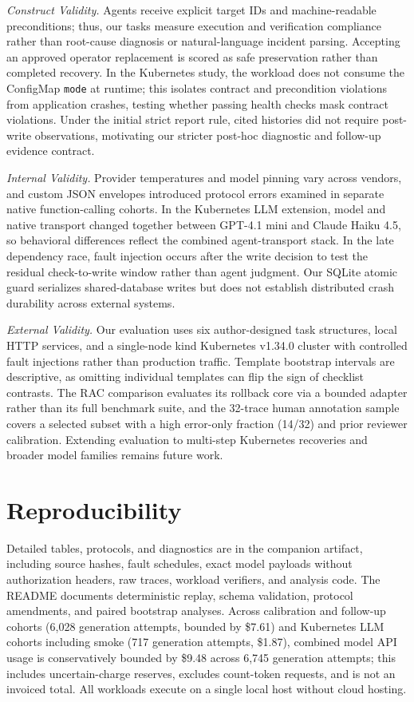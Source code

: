 \documentclass[conference,10pt]{IEEEtran}
\begin{document}
\emph{Construct Validity.} Agents receive explicit target IDs and machine\hyp{}readable preconditions; thus, our tasks measure execution and verification compliance rather than root\hyp{}cause diagnosis or natural\hyp{}language incident parsing. Accepting an approved operator replacement is scored as safe preservation rather than completed recovery. In the Kubernetes study, the workload does not consume the ConfigMap \texttt{mode} at runtime; this isolates contract and precondition violations from application crashes, testing whether passing health checks mask contract violations. Under the initial strict report rule, cited histories did not require post\hyp{}write observations, motivating our stricter post\hyp{}hoc diagnostic and follow\hyp{}up evidence contract.

\emph{Internal Validity.} Provider temperatures and model pinning vary across vendors, and custom JSON envelopes introduced protocol errors examined in separate native function\hyp{}calling cohorts. In the Kubernetes LLM extension, model and native transport changed together between GPT-4.1 mini and Claude Haiku 4.5, so behavioral differences reflect the combined agent\hyp{}transport stack. In the late dependency race, fault injection occurs after the write decision to test the residual check\hyp{}to\hyp{}write window rather than agent judgment. Our SQLite atomic guard serializes shared\hyp{}database writes but does not establish distributed crash durability across external systems.

\emph{External Validity.} Our evaluation uses six author\hyp{}designed task structures, local HTTP services, and a single\hyp{}node kind Kubernetes v1.34.0 cluster with controlled fault injections rather than production traffic. Template bootstrap intervals are descriptive, as omitting individual templates can flip the sign of checklist contrasts. The RAC comparison evaluates its rollback core via a bounded adapter rather than its full benchmark suite, and the 32-trace human annotation sample covers a selected subset with a high error\hyp{}only fraction (14/32) and prior reviewer calibration. Extending evaluation to multi\hyp{}step Kubernetes recoveries and broader model families remains future work.

\section{Reproducibility}

Detailed tables, protocols, and diagnostics are in the companion artifact, including source hashes, fault schedules, exact model payloads without authorization headers, raw traces, workload verifiers, and analysis code. The README documents deterministic replay, schema validation, protocol amendments, and paired bootstrap analyses. Across calibration and follow\hyp{}up cohorts (6,028 generation attempts, bounded by \$7.61) and Kubernetes LLM cohorts including smoke (717 generation attempts, \$1.87), combined model API usage is conservatively bounded by \$9.48 across 6,745 generation attempts; this includes uncertain\hyp{}charge reserves, excludes count\hyp{}token requests, and is not an invoiced total. All workloads execute on a single local host without cloud hosting.
\end{document}
